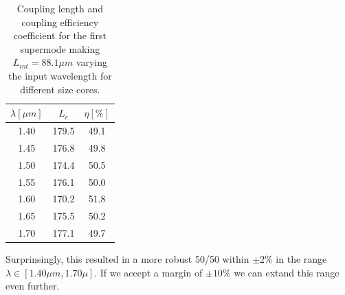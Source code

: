 \documentclass[a4paper,12pt]{article}
\begin{document}
\begin{table}[H]
    \centering
    \begin{tabular}{ccc}
        \toprule
        $\lambda [\mu m]$ & $L_c$ & $\eta[\%]$ \\
        \midrule
        1.40 & 179.5 & 49.1 \\
        1.45 & 176.8 & 49.8 \\
        1.50 & 174.4 & 50.5 \\
        1.55 & 176.1 & 50.0 \\
        1.60 & 170.2 & 51.8 \\
        1.65 & 175.5 & 50.2 \\
        1.70 & 177.1 & 49.7 \\    
        \bottomrule
    \end{tabular}
    \caption{Coupling length and coupling efficiency coefficient for the first supermode making $L_{int} = 88.1\mu m$ varying the input wavelength for different size cores.}
    \label{tab:wv_var}
\end{table}

Surprinsingly, this resulted in a more robust 50/50 within $\pm 2\%$ in the range $\lambda \in [1.40 \mu m, 1.70\mu]$. If we accept a margin of $\pm 10\%$ we can extand this range even further. 
\end{document}
